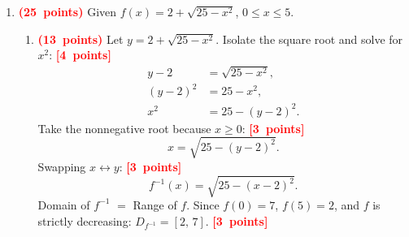 \documentclass[12pt,a4paper]{article}
\newcommand{\bobot}[1]{\mbox{\textcolor{red}{\textbf{(#1 points)}}}}
\newcommand{\poin}[1]{\mbox{\textcolor{red}{\textbf{[#1 points]}}}}
\begin{document}
\begin{enumerate}
\begin{enumerate}
          \item \bobot{13} Compute the composition: \poin{5}
                \[
                  (f \circ g)(x) = f\!\left(\frac{1}{x}\right)
                  = \sqrt{\frac{1}{x^2} - 9}
                  = \frac{\sqrt{1 - 9x^2}}{|x|}.
                \]
                Domain requires $x\ne0$ and $g(x)\in D_f$,
                i.e.\ $\dfrac{1}{x}\le-3$ or $\dfrac{1}{x}\ge3$:
                \begin{itemize}
                  \item $\dfrac{1}{x}\ge3$: $\dfrac{1-3x}{x}\ge0
                          \Rightarrow 0<x\le\dfrac{1}{3}$.
                  \item $\dfrac{1}{x}\le-3$: $\dfrac{1+3x}{x}\le0
                          \Rightarrow -\dfrac{1}{3}\le x<0$.
                \end{itemize}
                The domain conditions and their solution receive \poin{5}.

                Combining both intervals: \poin{3}
                \[
                  \boxed{D_{f\circ g} =
                    \left[-\tfrac{1}{3},\,0\right)\cup\left(0,\,\tfrac{1}{3}\right].}
                \]
        \end{enumerate}

  \item \bobot{25} Given $f(x) = 2 + \sqrt{25 - x^2}$, $0 \le x \le 5$.

        \begin{enumerate}
          \item \bobot{13} Let $y = 2 + \sqrt{25 - x^2}$.
                Isolate the square root and solve for $x^2$: \poin{4}
                \begin{align*}
                  y - 2   & = \sqrt{25 - x^2}, \\
                  (y-2)^2 & = 25 - x^2,        \\
                  x^2     & = 25 - (y-2)^2.
                \end{align*}
                Take the nonnegative root because $x\ge0$: \poin{3}
                \[
                  x = \sqrt{25-(y-2)^2}.
                \]
                Swapping $x \leftrightarrow y$: \poin{3}
                \[
                  \boxed{f^{-1}(x) = \sqrt{25 - (x-2)^2}.}
                \]
                Domain of $f^{-1}$ $=$ Range of $f$. Since $f(0)=7$, $f(5)=2$,
                and $f$ is strictly decreasing: $D_{f^{-1}} = [2,\,7]$. \poin{3}


\end{enumerate}
\end{enumerate}
\end{document}
